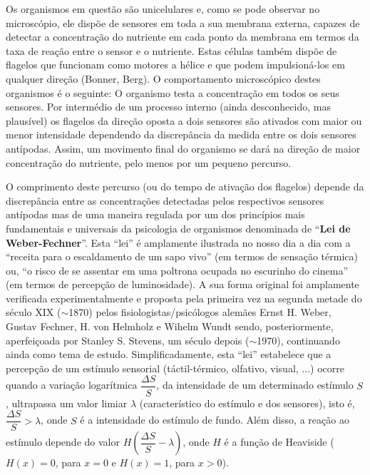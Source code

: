 Os organismos em questão são unicelulares e, como se pode observar no microscópio, ele dispõe de sensores em toda a sua membrana externa, capazes de detectar a concentração do nutriente em cada ponto da membrana em termos da taxa de reação entre o sensor e o nutriente. Estas células também dispõe de flagelos que funcionam como motores a hélice e que podem impulsioná-los em qualquer direção (Bonner, Berg). O comportamento microscópico destes organismos é o seguinte: O organismo testa a concentração em todos os seus sensores. Por intermédio de um processo interno (ainda desconhecido, mas plausível) os flagelos da direção oposta a dois sensores são ativados com maior ou menor intensidade dependendo da discrepância da medida entre os dois sensores antípodas. Assim, um movimento final do organismo se dará na direção de maior concentração do nutriente, pelo menos por um pequeno percurso.

O comprimento deste percurso (ou do tempo de ativação dos flagelos) depende da discrepância entre as concentrações detectadas pelos respectivos sensores antípodas mas de uma maneira regulada por um dos princípios mais fundamentais e universais da psicologia de organismos denominada de ``\textbf{Lei de Weber-Fechner}''. Esta ``lei'' é amplamente ilustrada no nosso dia a dia com a ``receita para o escaldamento de um sapo vivo'' (em termos de sensação térmica) ou, ``o risco de se assentar em uma poltrona ocupada no escurinho do cinema'' (em termos de percepção de luminosidade). A sua forma original foi amplamente verificada experimentalmente e proposta pela primeira vez na segunda metade do século XIX (\(\sim\)1870) pelos fisiologistas/psicólogos alemães Ernst H. Weber, Gustav Fechner, H. von Helmholz e Wihelm Wundt sendo, posteriormente, aperfeiçoada por Stanley S. Stevens, um século depois (\(\sim\)1970), continuando ainda como tema de estudo. Simplificadamente, esta ``lei'' estabelece que a percepção de um estímulo sensorial (táctil-térmico, olfativo, visual, ...) ocorre quando a variação logarítmica \(\dfrac{\Delta S}{S}\), da intensidade de um determinado estímulo \(S\), ultrapassa um valor limiar \(\lambda\) (característico do estímulo e dos sensores), isto é, \(\dfrac{\Delta S}{S} > \lambda\), onde \(S\) é a intensidade do estímulo de fundo. Além disso, a reação ao estímulo depende do valor \(H\left(\dfrac{\Delta S}{S} - \lambda\right)\), onde \(H\) é a função de Heaviside (\(H(x) = 0\), para \(x = 0\) e \(H(x) = 1\), para \(x > 0\)).

